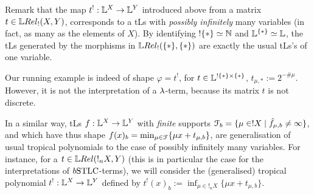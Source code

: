  Remark that the map $t^!:\mathbb{L}^X\to\mathbb{L}^Y$ introduced above from a matrix $t\in\HOM{\LREL_!}{X}{Y}$, corresponds to a tLs with \emph{possibly infinitely} many variables (in fact, as many as the elements of $X$). %
%
By identifying $!\{*\}\simeq \mathbb{N}$ and $\mathbb{L}^{\{*\}}\simeq\mathbb{L}$, the tLs generated by the morphisms in $\HOM{\LREL_!}{\set{*}}{\set{*}}$ are exactly the %
usual tLs's of one variable.
 \begin{remark}
 Our running example is indeed of shape $\varphi=t^!$, for $t\in\mathbb{L}^{!\{*\}\times\{*\}}$, $t_{\mu,*}:=2^{-\# \mu}$.
 However, it is not the interpretation of a $\lambda$-term, because its matrix $t$ is not discrete.
\end{remark}



 In a similar way, tLs
$f:\mathbb{L}^X\to\mathbb{L}^Y$ 
 with \emph{finite} supports $\mathcal{F}_b=\{\mu\in!X\mid\hat{f}_{\mu,b}\neq\infty\}$, and which have thus shape $f(x)_b=\min_{\mu\in\mathcal{F}} \{\mu x+ t_{\mu,b}\}$, are generalisation of usual tropical polynomials to the case of possibly infinitely many variables.
For instance, for a $t\in\HOM{\LREL}{!_n X}{Y}$ (this is in particular the case for the interpretations of $\BSTLC$-terms), we will consider the (generalised) tropical polynomial $t^!:\mathbb{L}^X\to\mathbb{L}^Y$ defined by $t^!(x)_b:=\inf_{\mu\in !_nX}\{\mu x+t_{\mu,b}\}$.
% 

